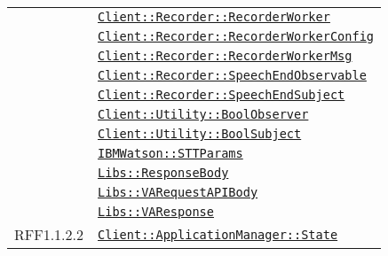 \begin{longtable}{|>{\centering}m{3cm}|m{10cm}<{\centering}|}
& \hyperref[Client::Recorder::RecorderWorker]{\texttt{Client::Recorder::RecorderWorker}}\\
& \hyperref[Client::Recorder::RecorderWorkerConfig]{\texttt{Client::Recorder::RecorderWorkerConfig}}\\
& \hyperref[Client::Recorder::RecorderWorkerMsg]{\texttt{Client::Recorder::RecorderWorkerMsg}}\\
& \hyperref[Client::Recorder::SpeechEndObservable]{\texttt{Client::Recorder::SpeechEndObservable}}\\
& \hyperref[Client::Recorder::SpeechEndSubject]{\texttt{Client::Recorder::SpeechEndSubject}}\\
& \hyperref[Client::Utility::BoolObserver]{\texttt{Client::Utility::BoolObserver}}\\
& \hyperref[Client::Utility::BoolSubject]{\texttt{Client::Utility::BoolSubject}}\\
& \hyperref[IBMWatson::STTParams]{\texttt{IBMWatson::STTParams}}\\
& \hyperref[Libs::ResponseBody]{\texttt{Libs::ResponseBody}}\\
& \hyperref[Libs::VARequestAPIBody]{\texttt{Libs::VARequestAPIBody}}\\
& \hyperref[Libs::VAResponse]{\texttt{Libs::VAResponse}}\\ \hline

RFF1.1.2.2 & \hyperref[Client::ApplicationManager::State]{\texttt{Client::ApplicationManager::State}}\\ \hline


\end{longtable}
